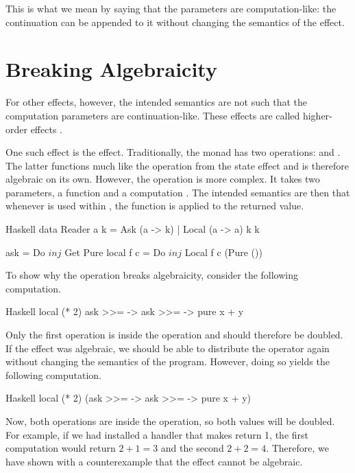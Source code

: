 This is what we mean by saying that the parameters are computation-like: the continuation can be appended to it without changing the semantics of the effect.

\section{Breaking Algebraicity}

For other effects, however, the intended semantics are not such that the computation parameters are continuation-like. These effects are called higher-order effects \citationneeded.

One such effect is the  effect. Traditionally, the  monad has two operations:  and . The latter functions much like the  operation from the state effect and is therefore algebraic on its own. However, the  operation is more complex. It takes two parameters, a function  and a computation . The intended semantics are then that whenever  is used within , the function  is applied to the returned value.

\begin{lst}{Haskell}
data Reader a k = Ask (a -> k) | Local (a -> a) k k

ask       = Do $ inj $ Get Pure
local f c = Do $ inj $ Local f c (Pure ())
\end{lst}
%
To show why the  operation breaks algebraicity, consider the following computation.

\begin{lst}{Haskell}
local (* 2) ask >>= \x -> ask >>= \y -> pure x + y
\end{lst}
%
Only the first  operation is inside the  operation and should therefore be doubled. If the  effect was algebraic, we should be able to distribute the \hs{>>=} operator again without changing the semantics of the program. However, doing so yields the following computation.

\begin{lst}{Haskell}
local (* 2) (ask >>= \x -> ask >>= \y -> pure x + y)
\end{lst}
%
Now, both  operations are inside the  operation, so both values will be doubled. For example, if we had installed a handler that makes  return 1, the first computation would return $2 + 1 = 3$ and the second $2 + 2 = 4$. Therefore, we have shown with a counterexample that the  effect cannot be algebraic.


